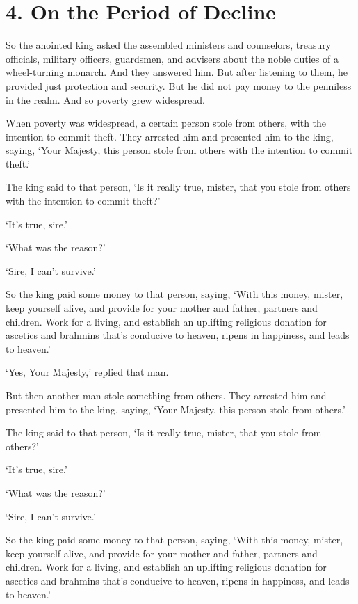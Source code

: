 \documentclass[12pt,openany]{book}%
\begin{document}
\section*{4. On the Period of Decline }

So the anointed king asked the assembled ministers and counselors, treasury officials, military officers, guardsmen, and advisers about the noble duties of a wheel-turning monarch. And they answered him. But after listening to them, he provided just protection and security. But he did not pay money to the penniless in the realm. And so poverty grew widespread. 

When poverty was widespread, a certain person stole from others, with the intention to commit theft. They arrested him and presented him to the king, saying, ‘Your Majesty, this person stole from others with the intention to commit theft.’ 

The king said to that person, ‘Is it really true, mister, that you stole from others with the intention to commit theft?’ 

‘It’s true, sire.’ 

‘What was the reason?’ 

‘Sire, I can’t survive.’ 

So the king paid some money to that person, saying, ‘With this money, mister, keep yourself alive, and provide for your mother and father, partners and children. Work for a living, and establish an uplifting religious donation for ascetics and brahmins that’s conducive to heaven, ripens in happiness, and leads to heaven.’ 

‘Yes, Your Majesty,’ replied that man. 

But then another man stole something from others. They arrested him and presented him to the king, saying, ‘Your Majesty, this person stole from others.’ 

The king said to that person, ‘Is it really true, mister, that you stole from others?’ 

‘It’s true, sire.’ 

‘What was the reason?’ 

‘Sire, I can’t survive.’ 

So the king paid some money to that person, saying, ‘With this money, mister, keep yourself alive, and provide for your mother and father, partners and children. Work for a living, and establish an uplifting religious donation for ascetics and brahmins that’s conducive to heaven, ripens in happiness, and leads to heaven.’ 
\end{document}
